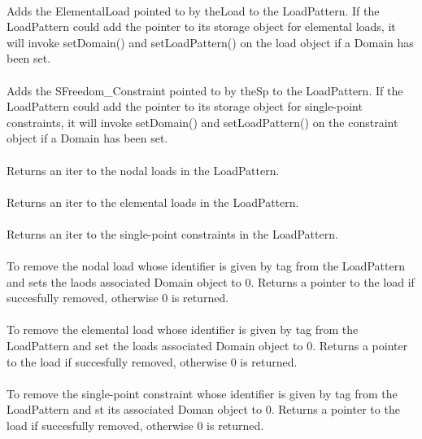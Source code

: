 \\
Adds the ElementalLoad pointed to by \p theLoad to the
LoadPattern. If the LoadPattern could add the pointer to its storage
object for elemental loads, it will invoke setDomain()
and setLoadPattern() on the load object if a Domain has been set. \\

\\ 
Adds the SFreedom\_Constraint pointed to by \p theSp to the
LoadPattern. If the LoadPattern could add the pointer to its storage
object for single-point constraints, it will invoke setDomain()
and setLoadPattern() on the constraint object if a Domain has
been set. \\

\\
Returns an iter to the nodal loads in the LoadPattern. \\

\\
Returns an iter to the elemental loads in the LoadPattern. \\

\\ 
Returns an iter to the single-point constraints in the LoadPattern. \\
    
\\
To remove the nodal load whose identifier is given by \p tag from
the LoadPattern and sets the laods associated Domain object to
$0$. Returns a pointer to the load if succesfully removed, otherwise
$0$ is returned. \\ 

\\
To remove the elemental load whose identifier is given by \p tag from
the LoadPattern and set the loads associated Domain object to
$0$. Returns a pointer to the load if succesfully removed, otherwise
$0$ is returned. \\ 

\\ 
To remove the single-point constraint whose identifier is given by \p tag from
the LoadPattern and st its associated Doman object to $0$. Returns a
pointer to the load if succesfully removed, otherwise $0$ is
returned. \\ 

